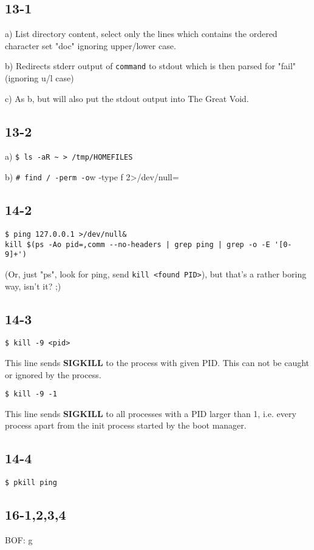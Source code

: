 \subsection{13-1}
a) List directory content, select only the lines which contains the ordered character set "doc" ignoring upper/lower case.

b) Redirects stderr output of \verb=command= to stdout which is then parsed for "fail" (ignoring u/l case)

c) As b, but will also put the stdout output into The Great Void.

\subsection{13-2}
a) \verb=$ ls -aR ~ > /tmp/HOMEFILES=

b) \verb=# find / -perm -o=w -type f 2>/dev/null=

\subsection{14-2}
\begin{verbatim}
$ ping 127.0.0.1 >/dev/null&
kill $(ps -Ao pid=,comm --no-headers | grep ping | grep -o -E '[0-9]+')
\end{verbatim}
(Or, just "ps", look for ping, send \verb=kill <found PID>=), but that's a rather boring way, isn't it? ;)

\subsection{14-3}
\verb=$ kill -9 <pid>=

This line sends \textbf{SIGKILL} to the process with given PID. This can not be caught or ignored by the process.

\verb=$ kill -9 -1=

This line sends \textbf{SIGKILL} to all processes with a PID larger than 1, i.e. every process apart from the init process started by the boot manager.

\subsection{14-4}
\verb=$ pkill ping=

\subsection{16-1,2,3,4}
BOF: g

